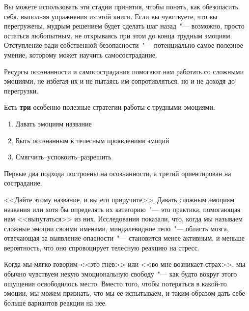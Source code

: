 Вы можете использовать эти стадии принятия, чтобы понять, как обезопасить себя, выполняя упражнения из этой книги. Если вы чувствуете, что вы перегружены, мудрым решением будет сделать шаг назад~"--- возможно, просто остаться любопытным, не открываясь при этом до конца трудным эмоциям. Отступление ради собственной безопасности~"--- потенциально самое полезное умение, которому может научить самосострадание.

Ресурсы осознанности и самосострадания помогают нам работать со сложными эмоциями, не избегая их и не пытаясь им сопротивляться, но и не доходя до перегрузки. 

\vspace{2ex}

Есть \textbf{три} особенно полезные стратегии работы с трудными эмоциями:
\begin{enumerate}
	\item Давать эмоциям название
	\item Быть осознанным к телесным проявлениям эмоций
	\item Смягчить--успокоить--разрешить
\end{enumerate} 

Первые два подхода построены на осознанности, а третий ориентирован на сострадание. 

\vspace{3ex}


\vspace{1ex}

<<Дайте этому название, и вы его приручите>>. Давать сложным эмоциям названия или хотя бы определять их категорию~"--- это практика, помогающая нам <<выпутаться>> из них. Исследования показали, что, когда мы называем сложные эмоции своими именами, миндалевидное тело~"--- область мозга, отвечающая за выявление опасности~"--- становится менее активным, и меньше вероятность, что оно спровоцирует телесную реакцию на стресс\cite{88}.

Когда мы мягко говорим <<это гнев>> или <<во мне возникает страх>>, мы обычно чувствуем некую эмоциональную свободу~"--- как будто вокруг этого ощущения освободилось место. Вместо того, чтобы потеряться в какой-то эмоции, мы можем признать, что мы ее испытываем, и таким образом дать себе больше вариантов реакции на нее.

\vspace{3ex}


